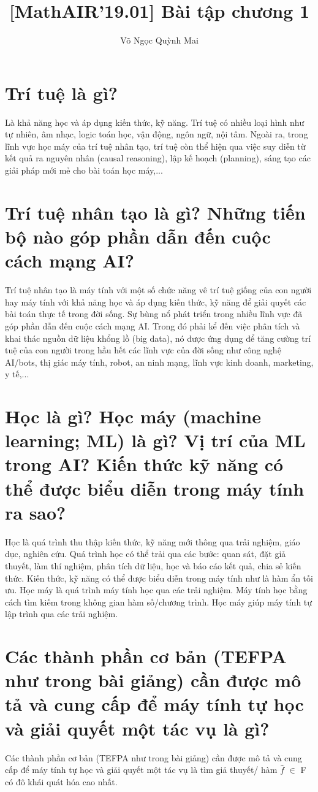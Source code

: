 \documentclass[12pt]{article}
\title{[MathAIR'19.01] Bài tập chương 1}
\author{Võ Ngọc Quỳnh Mai}
\begin{document}
\maketitle

\newpage


\section{Trí tuệ là gì?}

Là khả năng học và áp dụng kiến thức, kỹ năng. Trí tuệ có nhiều loại hình như tự nhiên, âm nhạc, logic toán học, vận động, ngôn ngữ, nội tâm. Ngoài ra, trong lĩnh vực học máy của trí tuệ nhân tạo, trí tuệ còn thể hiện qua việc suy diễn từ kết quả ra nguyên nhân (causal reasoning), lập kế hoạch (planning), sáng tạo các giải pháp mới mẻ cho bài toán học máy,...

\section{Trí tuệ nhân tạo là gì? Những tiến bộ nào góp phần dẫn đến cuộc cách mạng AI?}
Trí tuệ nhân tạo là máy tính với một số chức năng vê trí tuệ giống của con người hay máy tính với khả năng học và áp dụng kiến thức, kỹ năng để giải quyết các bài toán thực tế trong đời sống.
Sự bùng nổ phát triển trong nhiều lĩnh vực đã góp phần dẫn đến cuộc cách mạng AI. Trong đó phải kể đến việc phân tích và khai thác nguồn dữ liệu khổng lồ (big data), nó được ứng dụng để tăng cường trí tuệ của con người trong hầu hết các lĩnh vực của đời sống như công nghệ AI/bots, thị giác máy tính, robot, an ninh mạng, lĩnh vực kinh doanh, marketing, y tế,...


\section{Học là gì? Học máy (machine learning; ML) là gì? Vị trí của ML trong AI? Kiến thức kỹ năng có thể được biểu diễn trong máy tính ra sao?}
Học là quá trình thu thập kiến thức, kỹ năng mới thông qua trải nghiệm, giáo dục, nghiên cứu. Quá trình học có thể trải qua các bước: quan sát, đặt giả thuyết, làm thí nghiệm, phân tích dữ liệu, học và báo cáo kết quả, chia sẻ kiến thức. 
Kiến thức, kỹ năng có thể được biểu diễn trong máy tính như là hàm ẩn tối ưu. 
Học máy là quá trình máy tính học qua các trải nghiệm. Máy tính học bằng cách tìm kiếm trong không gian hàm số/chương trình. Học máy giúp máy tính tự lập trình qua các trải nghiệm.
\section{Các thành phần cơ bản (TEFPA như trong bài giảng) cần được mô tả và cung cấp để máy tính tự học và giải quyết một tác vụ là gì?}
Các thành phần cơ bản (TEFPA như trong bài giảng) cần được mô tả và cung cấp để máy tính tự học và giải quyết một tác vụ là tìm giả thuyết/ hàm $\hat{f}$ $\in$ F có đô khái quát hóa cao nhất.
\end{document}

